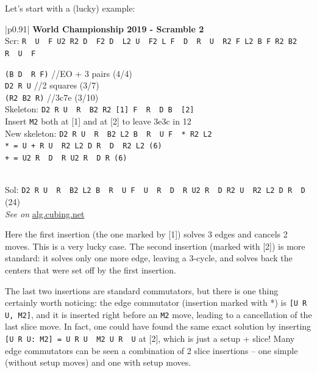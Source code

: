 \documentclass[11pt,a4paper]{book}
\newcommand{\p}{\textquotesingle}
\newcommand{\m}{\texttt}
\newcommand{\ps}{\p\,\,}
\newcommand{\comment}[1]{{\color{gray}\quad//#1}}
\begin{document}
Let's start with a (lucky) example:

\bigskip
\begin{tabular}{|p{}|}
\hline
\textbf{World Championship 2019 - Scramble 2}\\
\hline
Scr: \m{R\ps U\ps F U2 R2 D\ps F2 D\ps L2 U\ps F2 L F\ps D\ps R\ps U\ps R2 F L2 B F R2 B2 R\ps U\ps F}\\
\hline
\begin{minipage}[l]{0.650\textwidth}
\m{(B D\ps R F)} \comment{EO + 3 pairs (4/4)}\\
\m{D2 R U\p} \comment{2 squares (3/7)}\\
\m{(R2 B2 R)} \comment{3c7e (3/10)}\\
Skeleton: \m{D2 R U\ps R\ps B2 R2 [1] F\ps R\ps D B\ps [2]}\\
Insert \m{M2} both at [1] and at [2] to leave 3e3c in 12\\
New skeleton: \m{D2 R U\ps R\ps B2 L2 B\ps R\ps U F\ps * R2 L2}\\
\m{* = U + R U\ps R2 L2 D R\ps D\ps R2 L2 (6)}\\
\m{+ = U2 R\ps D\ps R U2 R\ps D R (6)}\\
\end{minipage}
\begin{minipage}[c]{0.25\textwidth}

\end{minipage}\\
\hline
Sol: \m{D2 R U\ps R\ps B2 L2 B\ps R\ps U F\ps U\ps R\ps D\ps R U2 R\ps D R2 U\ps R2 L2 D R\ps D\p} (24)\\
\hline
\emph{See on }\href{https://alg.cubing.net/?setup=R-_U-_F_U2_R2_D-_F2_D-_L2_U-_F2_L_F-_D-_R-_U-_R2_F_L2_B_F_R2_B2_R-_U-_F&alg=D2_R_U-_R-_B2_L2_B-_R-_U_F-_U-_R-_D-_R_U2_R-_D_R2_U-_R2_L2_D_R-_D-}{alg.cubing.net}\\
\hline
\end{tabular}
\bigskip

Here the first insertion (the one marked by [1]) solves 3 edges and cancels 2 moves. This is a very lucky case. The second insertion (marked with [2]) is more standard: it solves only one more edge, leaving a 3-cycle, and solves back the centers that were set off by the first insertion.

The last two insertions are standard commutators, but there is one thing certainly worth noticing: the edge commutator (insertion marked with *) is \m{[U R U\p, M2]}, and it is inserted right before an \m{M2} move, leading to a cancellation of the last slice move. In fact, one could have found the same exact solution by inserting \m{[U R U\p: M2] = U R U\ps M2 U R\ps U\p} at [2], which is just a setup + slice! Many edge commutators can be seen a combination of 2 slice insertions -- one simple (without setup moves) and one with setup moves.
\end{document}
